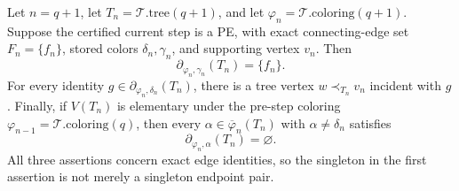 \begin{lemma}
Let \(n=q+1\), let \(T_n=\mathcal T.\mathrm{tree}(q+1)\), and let
\(\varphi_n=\mathcal T.\mathrm{coloring}(q+1)\).  Suppose the certified
current step is a PE, with exact connecting-edge set \(F_n=\{f_n\}\),
stored colors \(\delta_n,\gamma_n\), and supporting vertex \(v_n\).  Then
\[
 \partial_{\varphi_n,\gamma_n}(T_n)=\{f_n\}.
\]
For every identity \(g\in\partial_{\varphi_n,\delta_n}(T_n)\), there is a
tree vertex \(w\prec_{T_n}v_n\) incident with \(g\).  Finally, if
\(V(T_n)\) is elementary under the pre-step coloring
\(\varphi_{n-1}=\mathcal T.\mathrm{coloring}(q)\), then every
\(\alpha\in\overline\varphi_n(T_n)\) with \(\alpha\ne\delta_n\) satisfies
\[
 \partial_{\varphi_n,\alpha}(T_n)=\varnothing.
\]
All three assertions concern exact edge identities, so the singleton in
the first assertion is not merely a singleton endpoint pair.
\end{lemma}
